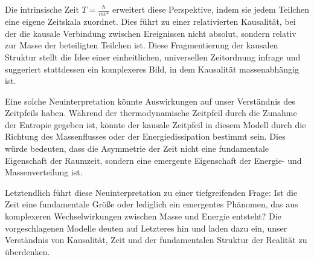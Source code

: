 \documentclass[a4paper,12pt]{article}
\begin{document}
Die intrinsische Zeit \( T = \frac{\hbar}{m c^2} \) erweitert diese Perspektive, indem sie jedem Teilchen eine eigene Zeitskala zuordnet. Dies führt zu einer relativierten Kausalität, bei der die kausale Verbindung zwischen Ereignissen nicht absolut, sondern relativ zur Masse der beteiligten Teilchen ist. Diese Fragmentierung der kausalen Struktur stellt die Idee einer einheitlichen, universellen Zeitordnung infrage und suggeriert stattdessen ein komplexeres Bild, in dem Kausalität massenabhängig ist.

Eine solche Neuinterpretation könnte Auswirkungen auf unser Verständnis des Zeitpfeils haben. Während der thermodynamische Zeitpfeil durch die Zunahme der Entropie gegeben ist, könnte der kausale Zeitpfeil in diesem Modell durch die Richtung des Massenflusses oder der Energiedissipation bestimmt sein. Dies würde bedeuten, dass die Asymmetrie der Zeit nicht eine fundamentale Eigenschaft der Raumzeit, sondern eine emergente Eigenschaft der Energie- und Massenverteilung ist.

Letztendlich führt diese Neuinterpretation zu einer tiefgreifenden Frage: Ist die Zeit eine fundamentale Größe oder lediglich ein emergentes Phänomen, das aus komplexeren Wechselwirkungen zwischen Masse und Energie entsteht? Die vorgeschlagenen Modelle deuten auf Letzteres hin und laden dazu ein, unser Verständnis von Kausalität, Zeit und der fundamentalen Struktur der Realität zu überdenken.
	
\end{document}
